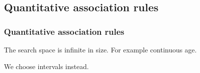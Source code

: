 
\subsection{Quantitative association rules}

\subsubsection{Quantitative association rules}

The search space is infinite in size. For example continuous age.

We choose intervals instead.

